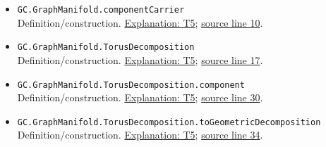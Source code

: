 \documentclass[
  letterpaper,
  11pt]{article}
\begin{document}
\begin{itemize}
\item
  {\small\texttt{GC.\allowbreak{}Graph\allowbreak{}Manifold.\allowbreak{}component\allowbreak{}Carrier}}\\
  Definition/construction. \hyperref[t5]{Explanation: T5};
  \href{https://github.com/qinz1yang/differential-geometry-dev/blob/ea0fae60ee01ef8c8d9b57a51794c6538f679c5d/DifferentialGeometry/Topology/ThreeManifold/TorusCut/Decomposition.lean\#L10}{source
  line 10}.
\item
  {\small\texttt{GC.\allowbreak{}Graph\allowbreak{}Manifold.\allowbreak{}Torus\allowbreak{}Decomposition}}\\
  Definition/construction. \hyperref[t5]{Explanation: T5};
  \href{https://github.com/qinz1yang/differential-geometry-dev/blob/ea0fae60ee01ef8c8d9b57a51794c6538f679c5d/DifferentialGeometry/Topology/ThreeManifold/TorusCut/Decomposition.lean\#L17}{source
  line 17}.
\item
  {\small\texttt{GC.\allowbreak{}Graph\allowbreak{}Manifold.\allowbreak{}Torus\allowbreak{}Decomposition.\allowbreak{}component}}\\
  Definition/construction. \hyperref[t5]{Explanation: T5};
  \href{https://github.com/qinz1yang/differential-geometry-dev/blob/ea0fae60ee01ef8c8d9b57a51794c6538f679c5d/DifferentialGeometry/Topology/ThreeManifold/TorusCut/Decomposition.lean\#L30}{source
  line 30}.
\item
  {\small\texttt{GC.\allowbreak{}Graph\allowbreak{}Manifold.\allowbreak{}Torus\allowbreak{}Decomposition.\allowbreak{}to\allowbreak{}Geometric\allowbreak{}Decomposition}}\\
  Definition/construction. \hyperref[t5]{Explanation: T5};
  \href{https://github.com/qinz1yang/differential-geometry-dev/blob/ea0fae60ee01ef8c8d9b57a51794c6538f679c5d/DifferentialGeometry/Topology/ThreeManifold/TorusCut/Decomposition.lean\#L34}{source
  line 34}.
\end{itemize}
\end{document}
